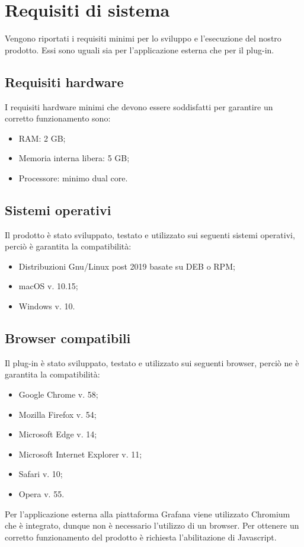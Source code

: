 \section{Requisiti di sistema}
Vengono riportati i requisiti minimi per lo sviluppo e l'esecuzione del nostro prodotto. Essi sono uguali sia per l'applicazione esterna che per il plug-in.

\subsection{Requisiti hardware}
I requisiti hardware minimi che devono essere soddisfatti per garantire un corretto funzionamento sono:
\begin{itemize}
	\item RAM: 2 GB;
	\item Memoria interna libera: 5 GB;
	\item Processore: minimo dual core.
\end{itemize}

\subsection{Sistemi operativi}
Il prodotto è stato sviluppato, testato e utilizzato sui seguenti sistemi operativi, perciò è garantita la compatibilità:
\begin{itemize}
	\item Distribuzioni Gnu/Linux post 2019 basate su DEB o RPM;
	\item macOS v. 10.15;
	\item Windows v. 10.
\end{itemize}

\subsection{Browser compatibili}
Il plug-in è stato sviluppato, testato e utilizzato sui seguenti browser, perciò ne è garantita la compatibilità:
\begin{itemize}
	\item Google Chrome v. 58;
	\item Mozilla Firefox v. 54;
	\item Microsoft Edge v. 14;
	\item Microsoft Internet Explorer v. 11;
	\item Safari v. 10;
	\item Opera v. 55.
\end{itemize}
Per l'applicazione esterna alla piattaforma Grafana viene utilizzato Chromium che è integrato, dunque non è necessario l'utilizzo di un browser.
Per ottenere un corretto funzionamento del prodotto è richiesta l'abilitazione di Javascript.

